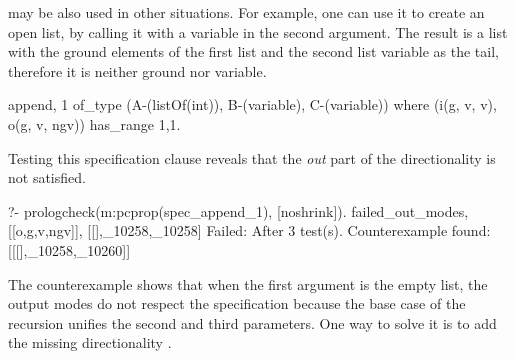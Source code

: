 may be %
also
used in other situations.
%
For example, one can use it to create an open list, by %
calling it with a variable in the second argument.
%
The result is a list with the ground elements of the first list and the
second list variable as the tail, therefore it is neither ground nor
variable.
%
\begin{yapcode}
 {append, 1} of_type (A-(listOf(int)), B-(variable), C-(variable))
   where (i(g, v, v), o(g, v, ngv))  has_range {1,1}.
\end{yapcode}
%
Testing this specification clause reveals that the \emph{out} part of
the directionality is not satisfied.
\begin{yapcode}
  ?- prologcheck(m:pcprop(spec_append_1), [noshrink]).
 {failed_out_modes,[[o,g,v,ngv]], [[],_10258,_10258]}
 Failed: After 3 test(s).
 Counterexample found: [[[],_10258,_10260]] 
\end{yapcode}
%
The counterexample shows that when the first argument is the empty
list, %
the output modes do not respect %
the specification %
because
the base case of the recursion
unifies the second and third parameters.
%
One way to solve it 
is to add the missing directionality .
%



